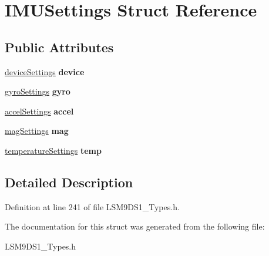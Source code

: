 \hypertarget{structIMUSettings}{}\section{I\+M\+U\+Settings Struct Reference}
\label{structIMUSettings}
\subsection*{Public Attributes}
\begin{DoxyCompactItemize}
\item 
\mbox{\label{structIMUSettings_a22b2648befc58307b43edc9e74acd583}} 
\mbox{\hyperlink{structdeviceSettings}{device\+Settings}} {\bfseries device}
\item 
\mbox{\label{structIMUSettings_afab65feef7d0ca778b035a8805b1e4bf}} 
\mbox{\hyperlink{structgyroSettings}{gyro\+Settings}} {\bfseries gyro}
\item 
\mbox{\label{structIMUSettings_aa8c7bf392c70397ae02ee1f5ad0ea474}} 
\mbox{\hyperlink{structaccelSettings}{accel\+Settings}} {\bfseries accel}
\item 
\mbox{\label{structIMUSettings_aca08359dfa3b8120aa687680d6c06ba7}} 
\mbox{\hyperlink{structmagSettings}{mag\+Settings}} {\bfseries mag}
\item 
\mbox{\label{structIMUSettings_a55a77555f1843c186db02080078632f2}} 
\mbox{\hyperlink{structtemperatureSettings}{temperature\+Settings}} {\bfseries temp}
\end{DoxyCompactItemize}


\subsection{Detailed Description}


Definition at line 241 of file L\+S\+M9\+D\+S1\+\_\+\+Types.\+h.



The documentation for this struct was generated from the following file\+:\begin{DoxyCompactItemize}
\item 
L\+S\+M9\+D\+S1\+\_\+\+Types.\+h\end{DoxyCompactItemize}
